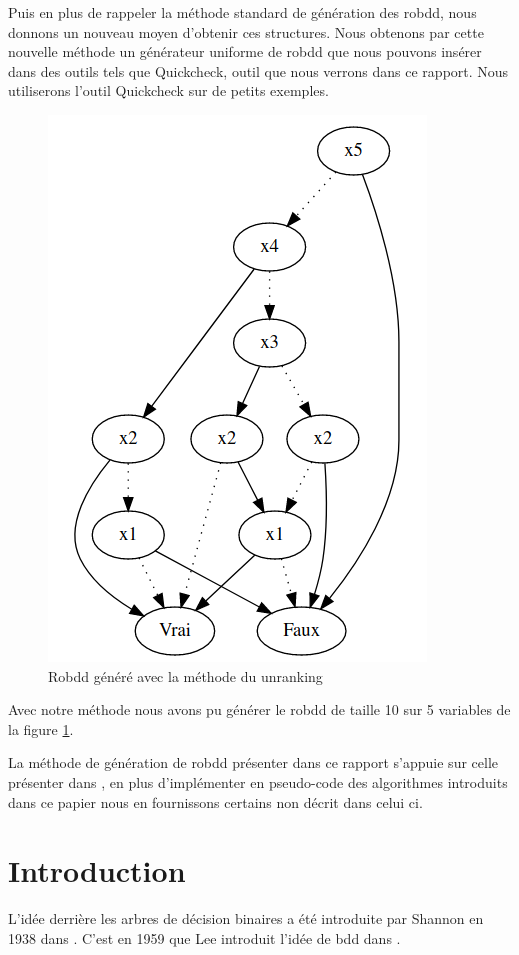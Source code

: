 \documentclass[french]{article}
\begin{document}
Puis en plus de rappeler la méthode standard de génération des robdd, nous donnons un nouveau moyen d'obtenir ces structures. Nous obtenons par cette nouvelle méthode un générateur uniforme de robdd que nous pouvons insérer dans des outils tels que Quickcheck, outil que nous verrons dans ce rapport. Nous utiliserons l'outil Quickcheck sur de petits exemples.

\begin{figure}[h!]
    \centering
    \includegraphics[scale=0.4]{robdd de presentation.png}
    \caption{Robdd généré avec la méthode du unranking}
    \label{fig:ROBDD1}
\end{figure}
\newpage
 Avec notre méthode nous avons pu générer le robdd de taille 10 sur 5 variables de la figure \ref{fig:ROBDD1}.
 
 La méthode de génération de robdd présenter dans ce rapport s'appuie sur celle présenter dans \cite{genitrini}, en plus d'implémenter en pseudo-code des algorithmes introduits dans ce papier nous en fournissons certains non décrit dans celui ci.



\section{Introduction}
L'idée derrière les arbres de décision binaires a été introduite par Shannon en 1938 dans \cite{shannon}. C'est en 1959 que Lee introduit l'idée de bdd dans \cite{lee}.
\end{document}
